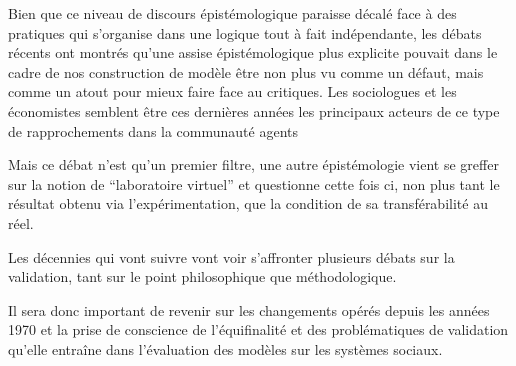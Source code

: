 Bien que ce niveau de discours épistémologique paraisse décalé face à des pratiques qui s'organise dans une logique tout à fait indépendante, les débats récents ont montrés qu'une assise épistémologique plus explicite pouvait dans le cadre de nos construction de modèle être non plus vu comme un défaut, mais comme un atout pour mieux faire face au critiques. Les sociologues \autocite{Hedstrom2010, Elsenbroich2012, Squazzoni2010, Manzo2007} et les économistes \autocite{Epstein1996} semblent être ces dernières années les principaux acteurs de ce type de rapprochements dans la communauté agents 

Mais ce débat n'est qu'un premier filtre, une autre épistémologie vient se greffer sur la notion de \enquote{laboratoire virtuel} et questionne cette fois ci, non plus tant le résultat obtenu via l'expérimentation, que la condition de sa transférabilité au réel.

Les décennies qui vont suivre vont voir s'affronter plusieurs débats sur la validation, tant sur le point philosophique que méthodologique.


Il sera donc important de revenir sur les changements opérés depuis les années 1970 et la prise de conscience de l'équifinalité et des problématiques de validation qu'elle entraîne dans l'évaluation des modèles sur les systèmes sociaux.




